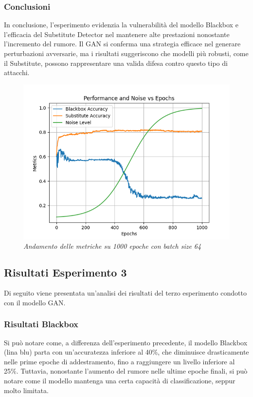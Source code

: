 \subsubsection{Conclusioni}
In conclusione, l'esperimento evidenzia la vulnerabilità del modello Blackbox e l'efficacia del Substitute Detector nel mantenere alte prestazioni nonostante l'incremento del rumore. Il GAN si conferma una strategia efficace nel generare perturbazioni avversarie, ma i risultati suggeriscono che modelli più robusti, come il Substitute, possono rappresentare una valida difesa contro questo tipo di attacchi.
\begin{figure}[ht]
    \centering
        \centering
        \includegraphics[width=0.8\linewidth]{images/graph_1000_epochs_64batch.png}
        \caption{\emph{Andamento delle metriche su 1000 epoche con batch size 64}}
        \label{fig:graph_1000_epochs_batch_64}
\end{figure}

\subsection{Risultati Esperimento 3}
Di seguito viene presentata un'analisi dei risultati del terzo esperimento condotto con il modello GAN.
\subsubsection{Risultati Blackbox}
Si può notare come, a differenza dell'esperimento precedente, il modello Blackbox (lina blu) parta con un'accuratezza inferiore al 40\%, che diminuisce drasticamente nelle prime epoche di addestramento, fino a raggiungere un livello inferiore al 25\%. Tuttavia, nonostante l'aumento del rumore nelle ultime epoche finali, si può notare come il modello mantenga una certa capacità di classificazione, seppur molto limitata.

